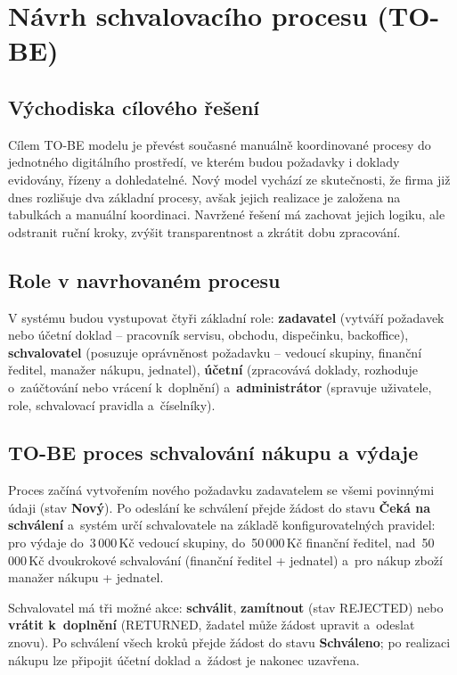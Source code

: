 \section{Návrh schvalovacího procesu (TO-BE)}


\subsection{Východiska cílového řešení}

Cílem TO-BE modelu je převést současné manuálně koordinované procesy do jednotného digitálního prostředí, ve kterém budou požadavky i doklady evidovány, řízeny a dohledatelné. Nový model vychází ze skutečnosti, že firma již dnes rozlišuje dva základní procesy, avšak jejich realizace je založena na tabulkách a manuální koordinaci. Navržené řešení má zachovat jejich logiku, ale odstranit ruční kroky, zvýšit transparentnost a zkrátit dobu zpracování.


\subsection{Role v navrhovaném procesu}

V systému budou vystupovat čtyři základní role:
\textbf{zadavatel} (vytváří požadavek nebo účetní doklad -- pracovník
servisu, obchodu, dispečinku, backoffice),
\textbf{schvalovatel} (posuzuje oprávněnost požadavku -- vedoucí
skupiny, finanční ředitel, manažer nákupu, jednatel),
\textbf{účetní} (zpracovává doklady, rozhoduje o~zaúčtování nebo
vrácení k~doplnění) a~\textbf{administrátor} (spravuje uživatele,
role, schvalovací pravidla a~číselníky).


\subsection{TO-BE proces schvalování nákupu a výdaje}

Proces začíná vytvořením nového požadavku zadavatelem se všemi
povinnými údaji (stav \textbf{Nový}). Po odeslání ke schválení přejde
žádost do stavu \textbf{Čeká na schválení} a~systém určí schvalovatele
na základě konfigurovatelných pravidel: pro výdaje do~3\,000\,Kč
vedoucí skupiny, do~50\,000\,Kč finanční ředitel, nad~50\,000\,Kč
dvoukrokové schvalování (finanční ředitel + jednatel) a~pro nákup
zboží manažer nákupu + jednatel.

Schvalovatel má tři možné akce: \textbf{schválit}, \textbf{zamítnout}
(stav REJECTED) nebo \textbf{vrátit k~doplnění} (RETURNED, žadatel
může žádost upravit a~odeslat znovu). Po schválení všech kroků přejde
žádost do stavu \textbf{Schváleno}; po realizaci nákupu lze připojit
účetní doklad a~žádost je nakonec uzavřena.

